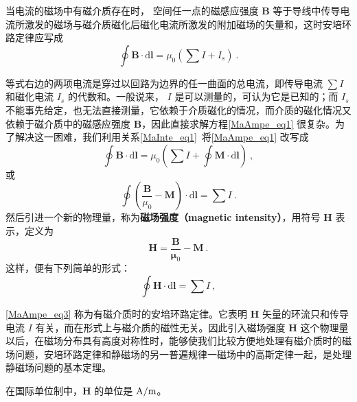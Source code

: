 

当电流的磁场中有磁介质存在时， 空间任一点的磁感应强度 $\mathbf B $ 等于导线中传导电流所激发的磁场与磁介质磁化后磁化电流所激发的附加磁场的矢量和，这时安培环路定律应写成
\begin{equation} \label{MaAmpe_eq1}
\oint \mathbf{B} \cdot \mathrm{d} \mathbf{l}=\mu_{0}\left(\sum I+I_{s}\right)~.
\end{equation}

等式右边的两项电流是穿过以回路为边界的任一曲面的总电流，即传导电流 $\sum I$ 和磁化电流 $I_s$ 的代数和。一般说来， $I $ 是可以测量的，可认为它是已知的；而 $I_s$ 不能事先给定，也无法直接测量，它依赖于介质磁化的情况，而介质的磁化情况又依赖于磁介质中的磁感应强度 $\mathbf B$，因此直接求解方程\autoref{MaAmpe_eq1} 很复杂。为了解决这一困难，我们利用关系\autoref{MaInte_eq1}~将\autoref{MaAmpe_eq1} 改写成
\begin{equation}
\oint \mathbf{B} \cdot \mathrm{d} \mathbf{l}=\mu_{0}\left(\sum I+\oint \mathbf{M} \cdot \mathrm{d} \mathbf{l}\right)~,
\end{equation}
或
\begin{equation} 
\oint\left(\frac{\mathbf{B}}{\mu_{0}}-\mathbf{M}\right) \cdot \mathrm{d} \mathbf{l}=\sum I~.
\end{equation}
然后引进一个新的物理量，称为\textbf{磁场强度（magnetic intensity）}，用符号 $\mathbf H$ 表示，定义为
\begin{equation} \label{MaAmpe_eq2}
\mathbf{H}=\frac{\mathbf{B}}{\mathbf{\mu}_{0}}-\mathbf{M}~.
\end{equation}
这样，便有下列简单的形式： 
\begin{equation} \label{MaAmpe_eq3}
\oint \mathbf{H} \cdot \mathrm{d} \mathbf{l}=\sum I~,
\end{equation}

\autoref{MaAmpe_eq3} 称为有磁介质时的安培环路定律。它表明 $\mathbf H $ 矢量的环流只和传导电流 $I $ 有关，而在形式上与磁介质的磁性无关。因此引入磁场强度 $\mathbf H $ 这个物理量以后，在磁场分布具有高度对称性时，能够使我们比较方便地处理有磁介质时的磁场问题，安培环路定律和静磁场的另一普遍规律一磁场中的高斯定律一起，是处理静磁场问题的基本定理。

在国际单位制中，$\mathbf  H $ 的单位是 $\rm A/m$。

